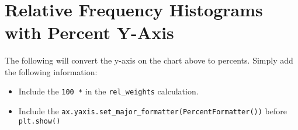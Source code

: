 \documentclass[11pt]{article}
\providecommand{\tightlist}{%
      \setlength{\itemsep}{0pt}\setlength{\parskip}{0pt}}
\begin{document}
    \begin{center}
    \end{center}
    { \hspace*{\fill} \\}
    
    \hypertarget{relative-frequency-histograms-with-percent-y-axis}{%
\section{Relative Frequency Histograms with Percent
Y-Axis}\label{relative-frequency-histograms-with-percent-y-axis}}

    The following will convert the y-axis on the chart above to percents.
Simply add the following information:

\begin{itemize}
\tightlist
\item
  Include the \texttt{100\ *} in the \texttt{rel\_weights} calculation.
\item
  Include the
  \texttt{ax.yaxis.set\_major\_formatter(PercentFormatter())} before
  \texttt{plt.show()}
\end{itemize}
\end{document}
